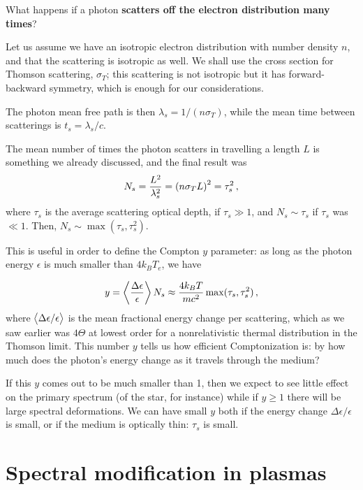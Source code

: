 \documentclass[main.tex]{subfiles}
\begin{document}
What happens if a photon \textbf{scatters off the electron distribution many times}? 

Let us assume we have an isotropic electron distribution with number density \(n\), and that the scattering is isotropic as well.
We shall use the cross section for Thomson scattering, \(\sigma _T\); this scattering is not isotropic but it has forward-backward symmetry, which is enough for our considerations.
 

The photon mean free path is then \(\lambda _s = 1 / (n \sigma _T)\), while the mean time between scatterings is \(t_s = \lambda _s / c\). 

The mean number of times the photon scatters in travelling a length \(L\) is something we already discussed, and the final result was 
%
\begin{align}
N_s = \frac{L^2}{\lambda _s^2} = \qty(n \sigma _T L)^2 = \tau _s^2
\,,
\end{align}
%
where \(\tau _s\) is the average scattering optical depth, if \(\tau _s \gg 1\), and \(N_s \sim \tau _s\) if \(\tau _s\) was \(\ll 1\). Then, \(N_s \sim \max (\tau _s, \tau _s^2)\). 

This is useful in order to define the Compton \(y\) parameter: as long as the photon energy \(\epsilon \) is much smaller than \(4 k_B T_e\), we have 

%
\begin{align}
y = \expval{\frac{\Delta \epsilon }{\epsilon }} N_s \approx \frac{4 k_B T}{mc^2 } \max(\tau _s , \tau _s^2)
\,,
\end{align}
%
where \(\expval{\Delta \epsilon / \epsilon }\) is the mean fractional energy change per scattering, which as we saw earlier was \(4 \Theta \) at lowest order for a nonrelativistic thermal distribution in the Thomson  limit. 
This number \(y \) tells us how efficient Comptonization is: by how much does the photon's energy change as it travels through the medium?

If this \(y\) comes out to be much smaller than 1, then we expect to see little effect on the primary spectrum (of the star, for instance) while if \(y \geq 1\)  there will be large spectral deformations. 
We can have small \(y\) both if the energy change \(\Delta \epsilon / \epsilon \) is small, or if the medium is optically thin: \(\tau _s\) is small. 

\chapter{Spectral modification in plasmas}
\end{document}
